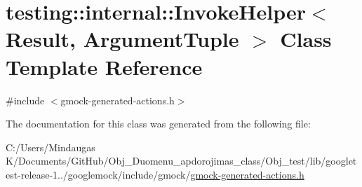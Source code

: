 \hypertarget{classtesting_1_1internal_1_1_invoke_helper}{}\section{testing\+::internal\+::Invoke\+Helper$<$ Result, Argument\+Tuple $>$ Class Template Reference}
\label{classtesting_1_1internal_1_1_invoke_helper}


{\ttfamily \#include $<$gmock-\/generated-\/actions.\+h$>$}



The documentation for this class was generated from the following file\+:\begin{DoxyCompactItemize}
\item 
C\+:/\+Users/\+Mindaugas K/\+Documents/\+Git\+Hub/\+Obj\+\_\+\+Duomenu\+\_\+apdorojimas\+\_\+class/\+Obj\+\_\+test/lib/googletest-\/release-\/1../googlemock/include/gmock/\mbox{\hyperlink{_obj__test_2lib_2googletest-release-1_88_81_2googlemock_2include_2gmock_2gmock-generated-actions_8h}{gmock-\/generated-\/actions.\+h}}\end{DoxyCompactItemize}
